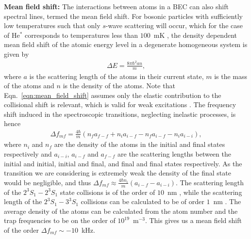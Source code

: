 \documentclass[%
 amsmath,amssymb,
aps,
]{revtex4-2}
\newcommand{\UpperState}{3^{3\!}S_1}%
\newcommand{\MetastableState}{2^{3\!}S_1}%
\begin{document}
         \textbf{Mean field shift:} The interactions between atoms in a BEC can also shift spectral lines, termed the mean field shift. For bosonic particles with sufficiently low temperatures such that only \(s\)-wave scattering will occur, which for the case of He\(^*\) corresponds to temperatures less than \(100\)~mK \cite{Julienne:89}, the density dependent mean field shift of the atomic energy level in a degenerate homogeneous system is given by \cite{PhysRevLett.81.3807}
         \begin{align}
             \Delta E = \frac{8 \pi \hbar^2 a n}{m},\label{eqn:mean_field_shift}
         \end{align}
         where \(a\) is the scattering length of the atoms in their current state, \(m\) is the mass of the atoms and \(n\) is the density of the atoms. Note that Eqn.~\ref{eqn:mean_field_shift} assumes only the elastic contribution to the collisional shift is relevant, which is valid for weak excitations \cite{PhysRevLett.81.3807}. The frequency shift induced in the spectroscopic transitions, neglecting inelastic processes, is hence
         \begin{align}
             \Delta f_{mf} = \frac{4 \hbar}{m} \left(n_f a_{f-f} + n_i a_{i-f} - n_f a_{i-f} - n_i a_{i-i}\right),
         \end{align} 
         where \(n_i\) and \(n_f\) are the density of the atoms in the initial and final states respectively and \(a_{i-i}\), \(a_{i-f}\) and \(a_{f-f}\) are the scattering lengths between the initial and initial, initial and final, and final and final states respectively. As the transition we are considering is extremely weak the density of the final state would be negligible, and thus \(\Delta f_{mf} \approx  \frac{4 \hbar n_i}{m} (a_{i-f} - a_{i-i})\). The scattering length of the \(\MetastableState-\MetastableState\) state collisions is of the order of \(10\)~nm \cite{PhysRevLett.96.023203,PhysRevLett.93.090409}, while the scattering length of the \(\MetastableState-\UpperState\) collisions can be calculated to be of order \(1\)~nm \cite{PhysRevA.48.546,PhysRevA.64.042710,TALU200183}. The average density of the atoms can be calculated from the atom number and the trap frequencies to be on the order of \(10^{19}\)~m\(^{-3}\). This gives us a mean field shift of the order \(\Delta f_{mf} \sim -10\)~kHz.\\
         
\end{document}
